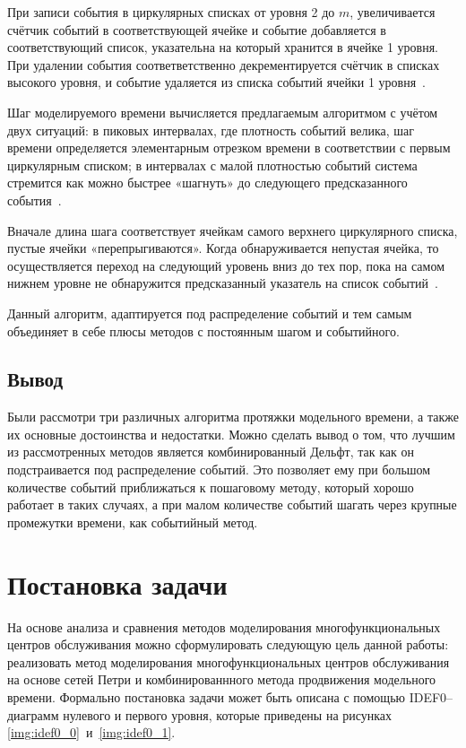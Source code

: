 При записи события в циркулярных списках от уровня 2 до $m$, увеличивается счётчик событий в соответствующей ячейке и событие добавляется в соответствующий список, указательна на который хранится в ячейке 1 уровня. При удалении события соответветственно декрементируется счётчик в списках высокого уровня, и событие удаляется из списка событий ячейки 1 уровня~\cite{delft}. 

Шаг моделируемого времени вычисляется предлагаемым алгоритмом с учётом двух ситуаций: в пиковых интервалах, где плотность событий велика, шаг времени определяется элементарным отрезком времени в  соответствии с первым циркулярным списком; в интервалах с малой плотностью событий система стремится как можно быстрее «шагнуть» до следующего предсказанного события~\cite{delft}.

Вначале длина шага соответствует ячейкам самого верхнего циркулярного списка, пустые ячейки «перепрыгиваются». Когда обнаруживается непустая ячейка, то осуществляется переход на следующий уровень вниз до тех пор, пока на самом нижнем уровне не обнаружится предсказанный указатель на список событий~\cite{delft}.

Данный алгоритм, адаптируется под распределение событий и тем самым объединяет в себе плюсы методов с постоянным шагом и событийного.

\subsection*{Вывод}

Были рассмотри три различных алгоритма протяжки модельного времени, а также их основные достоинства и недостатки. Можно сделать вывод о том, что лучшим из рассмотренных методов является комбинированный Дельфт, так как он подстраивается под распределение событий. Это позволяет ему при большом количестве событий приближаться к пошаговому методу, который хорошо работает в таких случаях, а при малом количестве событий шагать через крупные промежутки времени, как событийный метод.


\section{Постановка задачи}

На основе анализа и сравнения методов моделирования многофункциональных центров обслуживания можно сформулировать следующую цель данной работы: реализовать метод моделирования многофункциональных центров обслуживания на основе сетей Петри и комбинированнного метода продвижения модельного времени. Формально постановка задачи может быть описана с помощью IDEF0--диаграмм нулевого и первого уровня, которые приведены на рисунках \ref{img:idef0_0}~и~\ref{img:idef0_1}.

